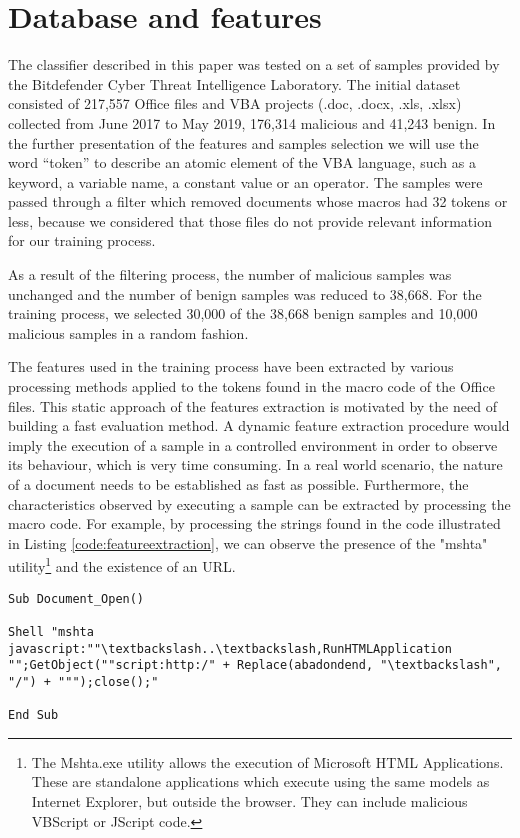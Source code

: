 \section{Database and features}
\par
The classifier described in this paper was tested on a set of samples provided by the Bitdefender Cyber Threat Intelligence Laboratory. The initial dataset consisted of 217,557 Office files and VBA projects (.doc, .docx, .xls, .xlsx) collected from June 2017 to May 2019, 176,314 malicious and 41,243 benign. In the further presentation of the features and samples selection we will use the word “token” to describe an atomic element of the VBA language, such as a keyword, a variable name, a constant value or an operator. The samples were passed through a filter which removed documents whose macros had 32 tokens or less,  because we considered that those files do not provide relevant information for our training process. 
\par
As a result of the filtering process, the number of malicious samples was unchanged and the number of benign samples was reduced to 38,668. For the training process, we selected 30,000 of the 38,668 benign samples and 10,000 malicious samples in a random fashion.
\par
The features used in the training process have been extracted by various processing methods applied to the tokens found in the macro code of the Office files. This static approach of the features extraction is motivated by the need of building a fast evaluation method. A dynamic feature extraction procedure would imply the execution of a sample in a controlled environment in order to observe its behaviour, which is very time consuming. In a real world scenario, the nature of a document needs to be established as fast as possible. Furthermore, the characteristics observed by executing a sample can be extracted by processing the macro code. For example, by processing the strings found in the code illustrated in Listing \ref{code:featureextraction}, we can observe the presence of the "mshta" utility\footnote{The Mshta.exe utility allows the execution of Microsoft HTML Applications. These are standalone applications which execute using the same models as Internet Explorer, but outside the browser. They can include malicious VBScript or JScript code.}   and the existence of an URL.

\begin{lstlisting}[style=A, caption={Example of malicious code inside a macro}, label={code:featureextraction}]
Sub Document_Open()

Shell "mshta javascript:""\textbackslash..\textbackslash,RunHTMLApplication "";GetObject(""script:http:/" + Replace(abadondend, "\textbackslash", "/") + """);close();"

End Sub
\end{lstlisting}

